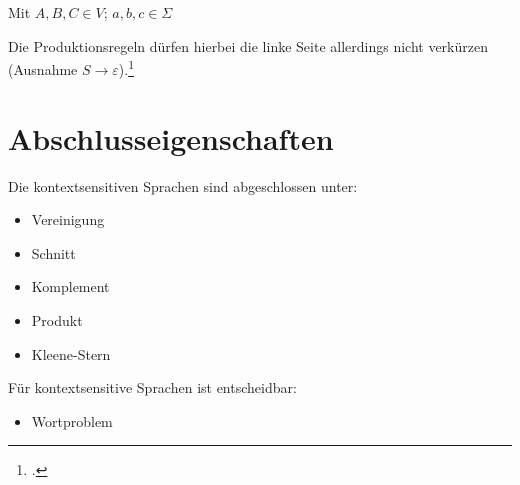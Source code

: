 \documentclass{bschlangaul-haupt}
\begin{document}
Mit $A,B,C \in V$; $a,b,c \in \Sigma$



Die Produktionsregeln dürfen hierbei die linke Seite allerdings nicht
verkürzen (Ausnahme $S \rightarrow \varepsilon$).\footcite{theo:fs:3}

%

\section{Abschlusseigenschaften}

Die kontextsensitiven Sprachen sind abgeschlossen unter:

\begin{itemize}
\item Vereinigung
\item Schnitt
\item Komplement
\item Produkt
\item Kleene-Stern
\end{itemize}

Für kontextsensitive Sprachen ist entscheidbar:

\begin{itemize}
\item Wortproblem
\end{itemize}

\literatur
\end{document}
